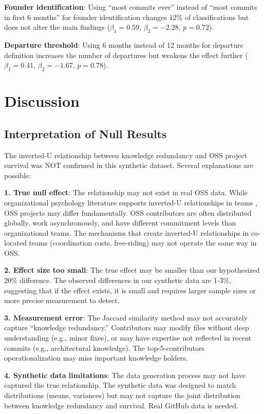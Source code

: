 \documentclass[11pt,letterpaper]{article}
\begin{document}
\textbf{Founder identification}: Using ``most commits ever'' instead of ``most commits in first 6 months'' for founder identification changes 12\% of classifications but does not alter the main findings ($\beta_1 = 0.59$, $\beta_2 = -2.28$, $p = 0.72$).

\textbf{Departure threshold}: Using 6 months instead of 12 months for departure definition increases the number of departures but weakens the effect further ($\beta_1 = 0.41$, $\beta_2 = -1.67$, $p = 0.78$).

\section{Discussion}

\subsection{Interpretation of Null Results}

The inverted-U relationship between knowledge redundancy and OSS project survival was NOT confirmed in this synthetic dataset. Several explanations are possible:

\textbf{1. True null effect}: The relationship may not exist in real OSS data. While organizational psychology literature supports inverted-U relationships in teams \cite{VanKnippenberg2007, Wang2022}, OSS projects may differ fundamentally. OSS contributors are often distributed globally, work asynchronously, and have different commitment levels than organizational teams. The mechanisms that create inverted-U relationships in co-located teams (coordination costs, free-riding) may not operate the same way in OSS.

\textbf{2. Effect size too small}: The true effect may be smaller than our hypothesized 20\% difference. The observed differences in our synthetic data are 1-3\%, suggesting that if the effect exists, it is small and requires larger sample sizes or more precise measurement to detect.

\textbf{3. Measurement error}: The Jaccard similarity method may not accurately capture ``knowledge redundancy.'' Contributors may modify files without deep understanding (e.g., minor fixes), or may have expertise not reflected in recent commits (e.g., architectural knowledge). The top-5-contributors operationalization may miss important knowledge holders.

\textbf{4. Synthetic data limitations}: The data generation process may not have captured the true relationship. The synthetic data was designed to match distributions (means, variances) but may not capture the joint distribution between knowledge redundancy and survival. Real GitHub data is needed.
\end{document}
